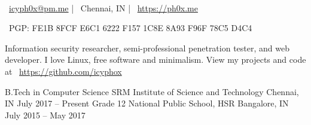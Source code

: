 \documentclass[]{awesome-cv}
\begin{document}
    
\begin{center}
	  \\
	\vspace{2mm}
	{\faEnvelope\ \href{mailto:icyph0x@pm.me}{icyph0x@pm.me}} | {\faMapMarker\ Chennai, IN} | {\faLink\ \url{https://ph0x.me}}
	\begin{center}
		{\faKey\ PGP: FE1B 8FCF E6C1 6222 F157 1C8E 8A93 F96F 78C5 D4C4}
	\end{center} 
\end{center} 
\begin{center}
	Information security researcher, semi-professional penetration tester, and web developer. I love Linux, free software and minimalism. View my projects and code at
	{\faGithub\ \url{https://github.com/icyphox}}
\end{center}
\begin{cventries}
	\cventry
	{B.Tech in Computer Science}
	{SRM Institute of Science and Technology}
	{Chennai, IN}
	{July 2017 – Present}
	{}
	\cventry
	{Grade 12}
	{National Public School, HSR}
	{Bangalore, IN}
	{July 2015 – May 2017}
	{}
\end{cventries}
\end{document}
